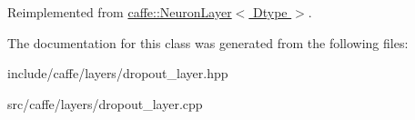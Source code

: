 Reimplemented from \hyperlink{classcaffe_1_1NeuronLayer_a810f5f75b95ba7fdcb9d3e0e33e98a7e}{caffe\+::\+Neuron\+Layer$<$ Dtype $>$}.



The documentation for this class was generated from the following files\+:\begin{DoxyCompactItemize}
\item 
include/caffe/layers/dropout\+\_\+layer.\+hpp\item 
src/caffe/layers/dropout\+\_\+layer.\+cpp\end{DoxyCompactItemize}
